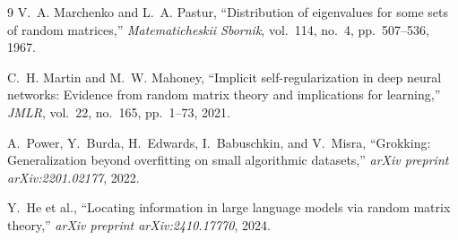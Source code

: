 \documentclass[11pt]{article}
\begin{document}
\begin{thebibliography}{9}
V.~A. Marchenko and L.~A. Pastur, ``Distribution of eigenvalues for some sets of random matrices,'' \textit{Matematicheskii Sbornik}, vol.~114, no.~4, pp.~507--536, 1967.

C.~H. Martin and M.~W. Mahoney, ``Implicit self-regularization in deep neural networks: Evidence from random matrix theory and implications for learning,'' \textit{JMLR}, vol.~22, no.~165, pp.~1--73, 2021.

A.~Power, Y.~Burda, H.~Edwards, I.~Babuschkin, and V.~Misra, ``Grokking: Generalization beyond overfitting on small algorithmic datasets,'' \textit{arXiv preprint arXiv:2201.02177}, 2022.

Y.~He et al., ``Locating information in large language models via random matrix theory,'' \textit{arXiv preprint arXiv:2410.17770}, 2024.
\end{thebibliography}
\end{document}
